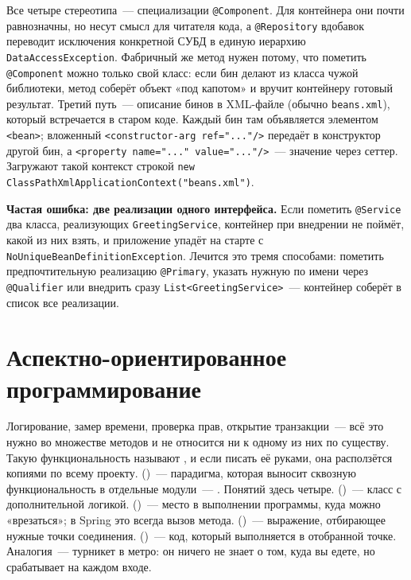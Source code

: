 Все четыре стереотипа~--- специализации \texttt{@Component}. Для контейнера они
почти равнозначны, но несут смысл для читателя кода, а \texttt{@Repository}
вдобавок переводит исключения конкретной СУБД в единую иерархию
\texttt{DataAccessException}. Фабричный же метод нужен потому, что пометить
\texttt{@Component} можно только свой класс: если бин делают из класса чужой
библиотеки, метод соберёт объект «под капотом» и вручит контейнеру готовый
результат. Третий путь~--- описание бинов в XML-файле
(обычно \texttt{beans.xml}), который встречается в старом коде. Каждый бин там
объявляется элементом
\texttt{<bean>}; вложенный \texttt{<constructor-arg ref="..."/>} передаёт в
конструктор другой бин, а \texttt{<property name="..." value="..."/>}~---
значение через сеттер. Загружают такой контекст строкой
\texttt{new ClassPathXmlApplicationContext("beans.xml")}.

\begin{oshibka}
\textbf{Частая ошибка: две реализации одного интерфейса.} Если пометить
\texttt{@Service} два класса, реализующих \texttt{GreetingService}, контейнер
при внедрении не поймёт, какой из них взять, и приложение упадёт на старте с
\texttt{NoUniqueBeanDefinitionException}. Лечится это тремя способами: пометить
предпочтительную реализацию \texttt{@Primary}, указать нужную по имени через
\texttt{@Qualifier} или внедрить сразу \texttt{List<GreetingService>}~---
контейнер соберёт в список все реализации.
\end{oshibka}

\section{Аспектно-ориентированное программирование}

Логирование, замер времени, проверка прав, открытие транзакции~--- всё это
нужно во множестве методов и не относится ни к одному из них по существу.
Такую функциональность называют , и если писать её руками, она
расползётся копиями по всему проекту.
 ()~--- парадигма, которая выносит сквозную функциональность в
отдельные модули~--- . Понятий здесь четыре. 
()~--- класс с дополнительной логикой. 
()~--- место в выполнении программы, куда можно «врезаться»; в
Spring это всегда вызов метода.  ()~--- выражение,
отбирающее нужные точки соединения.  ()~--- код,
который выполняется в отобранной точке. Аналогия~--- турникет в метро: он
ничего не знает о том, куда вы едете, но срабатывает на каждом входе.

